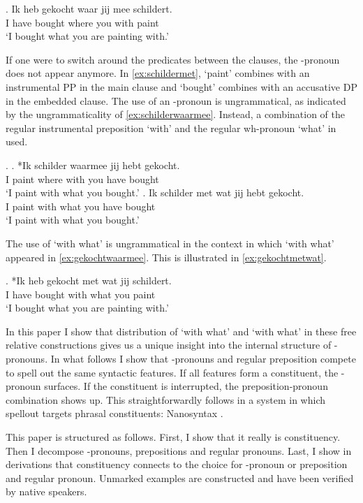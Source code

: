 \documentclass{article}
\begin{document}
\exg. Ik heb gekocht waar jij mee schildert.\\
 I have bought where you with paint\\
 `I bought what you are painting with.'\label{ex:gekochtwaarmee}

If one were to switch around the predicates between the clauses, the -pronoun does not appear anymore. In \ref{ex:schildermet},  `paint' combines with an instrumental PP in the main clause and  `bought' combines with an accusative DP in the embedded clause. The use of an -pronoun is ungrammatical, as indicated by the ungrammaticality of \ref{ex:schilderwaarmee}. Instead, a combination of the regular instrumental preposition  `with' and the regular wh-pronoun  `what' in used.

\ex.\label{ex:schildermet}
\ag. *Ik schilder waarmee jij hebt gekocht.\\
 I paint {where with} you have bought\\
 `I paint with what you bought.'\label{ex:schilderwaarmee}
\bg. Ik schilder met wat jij hebt gekocht.\\
 I paint with what you have bought\\
 `I paint with what you bought.'\label{ex:schildermetwat}

The use of  `with what' is ungrammatical in the context in which  `with what' appeared in \ref{ex:gekochtwaarmee}. This is illustrated in \ref{ex:gekochtmetwat}.

\exg. *Ik heb gekocht met wat jij schildert.\\
 I have bought with what you paint\\
 `I bought what you are painting with.'\label{ex:gekochtmetwat}

In this paper I show that distribution of  `with what' and  `with what' in these free relative constructions gives us a unique insight into the internal structure of -pronouns. In what follows I show that -pronouns and regular preposition compete to spell out the same syntactic features. If all features form a constituent, the -pronoun surfaces. If the constituent is interrupted, the preposition-pronoun combination shows up. This straightforwardly follows in a system in which spellout targets phrasal constituents: Nanosyntax \citep{starke2009}.

This paper is structured as follows. First, I show that it really is constituency. Then I decompose -pronouns, prepositions and regular pronouns. Last, I show in derivations that constituency connects to the choice for -pronoun or preposition and regular pronoun. Unmarked examples are constructed and have been verified by native speakers.
\end{document}
